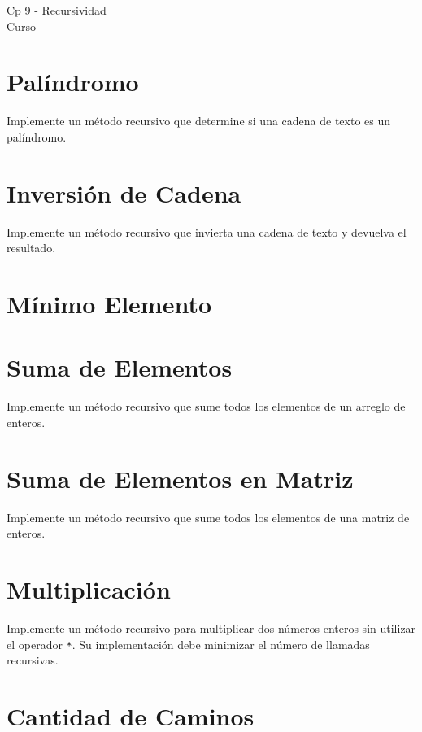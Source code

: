 \begin{center}
    \begin{large}
    Cp 9 - Recursividad\\
    Curso \academicyear\\
    \end{large}
\end{center}

\section{Palíndromo}  
Implemente un método recursivo que determine si una cadena de texto es un palíndromo.  

\section{Inversión de Cadena}  
Implemente un método recursivo que invierta una cadena de texto y devuelva el resultado.  

\section{Mínimo Elemento}  
  

\section{Suma de Elementos}  
Implemente un método recursivo que sume todos los elementos de un arreglo de enteros.  

\section{Suma de Elementos en Matriz}  
Implemente un método recursivo que sume todos los elementos de una matriz de enteros.

\section{Multiplicación}  
Implemente un método recursivo para multiplicar dos números enteros sin utilizar el operador \texttt{*}. Su implementación debe minimizar el número de llamadas recursivas.  

\section{Cantidad de Caminos}  
  

